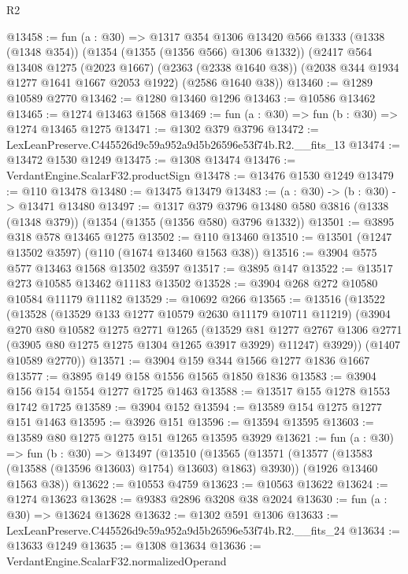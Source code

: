\begin{lexlean}{R2}
\begin{coremodule}
@13458 := fun (a : @30) =>
  @1317
    @354
    @1306
    @13420
    @566
    @1333
    (@1338 (@1348 @354))
    (@1354 (@1355 (@1356 @566) @1306 @1332))
    (@2417
      @564
      @13408
      @1275
      (@2023 @1667)
      (@2363 (@2338 @1640 @38))
      (@2038 @344 @1934 @1277 @1641 @1667 @2053 @1922)
      (@2586 @1640 @38))
@13460 := @1289 @10589 @2770
@13462 := @1280 @13460 @1296
@13463 := @10586 @13462
@13465 := @1274 @13463 @1568
@13469 := fun (a : @30) => fun (b : @30) => @1274 @13465 @1275
@13471 := @1302 @379 @3796
@13472 := LexLeanPreserve.C445526d9c59a952a9d5b26596e53f74b.R2.__fits_13
@13474 := @13472 @1530 @1249
@13475 := @1308 @13474
@13476 := VerdantEngine.ScalarF32.productSign
@13478 := @13476 @1530 @1249
@13479 := @110 @13478
@13480 := @13475 @13479
@13483 := (a : @30) -> (b : @30) -> @13471 @13480
@13497 := @1317
    @379
    @3796
    @13480
    @580
    @3816
    (@1338 (@1348 @379))
    (@1354 (@1355 (@1356 @580) @3796 @1332))
@13501 := @3895 @318 @578 @13465 @1275
@13502 := @110 @13460
@13510 := @13501 (@1247 @13502 @3597) (@110 (@1674 @13460 @1563 @38))
@13516 := @3904 @575 @577 @13463 @1568 @13502 @3597
@13517 := @3895 @147
@13522 := @13517 @273 @10585 @13462 @11183 @13502
@13528 := @3904 @268 @272 @10580 @10584 @11179 @11182
@13529 := @10692 @266
@13565 := @13516
    (@13522
      (@13528
        (@13529 @133 @1277 @10579 @2630 @11179 @10711 @11219)
        (@3904
          @270
          @80
          @10582
          @1275
          @2771
          @1265
          (@13529
            @81
            @1277
            @2767
            @1306
            @2771
            (@3905 @80 @1275 @1275 @1304 @1265 @3917 @3929)
            @11247)
          @3929))
      (@1407 @10589 @2770))
@13571 := @3904 @159 @344 @1566 @1277 @1836 @1667
@13577 := @3895 @149 @158 @1556 @1565 @1850 @1836
@13583 := @3904 @156 @154 @1554 @1277 @1725 @1463
@13588 := @13517 @155 @1278 @1553 @1742 @1725
@13589 := @3904 @152
@13594 := @13589 @154 @1275 @1277 @151 @1463
@13595 := @3926 @151
@13596 := @13594 @13595
@13603 := @13589 @80 @1275 @1275 @151 @1265 @13595 @3929
@13621 := fun (a : @30) =>
  fun (b : @30) =>
  @13497
    (@13510
      (@13565 (@13571 (@13577 (@13583 (@13588 (@13596 @13603) @1754) @13603) @1863) @3930))
      (@1926 @13460 @1563 @38))
@13622 := @10553 @4759
@13623 := @10563 @13622
@13624 := @1274 @13623
@13628 := @9383 @2896 @3208 @38 @2024
@13630 := fun (a : @30) => @13624 @13628
@13632 := @1302 @591 @1306
@13633 := LexLeanPreserve.C445526d9c59a952a9d5b26596e53f74b.R2.__fits_24
@13634 := @13633 @1249
@13635 := @1308 @13634
@13636 := VerdantEngine.ScalarF32.normalizedOperand

\end{coremodule}
\end{lexlean}
